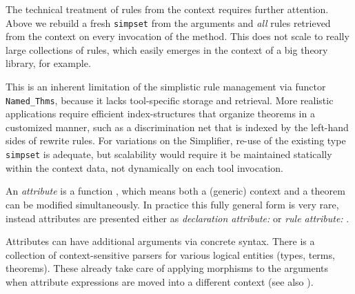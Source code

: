 \begin{isabellebody}
\begin{isamarkuptext}
  \medskip The technical treatment of rules from the context requires
  further attention.  Above we rebuild a fresh \verb|simpset| from
  the arguments and \emph{all} rules retrieved from the context on
  every invocation of the method.  This does not scale to really large
  collections of rules, which easily emerges in the context of a big
  theory library, for example.

  This is an inherent limitation of the simplistic rule management via
  functor \verb|Named_Thms|, because it lacks tool-specific
  storage and retrieval.  More realistic applications require
  efficient index-structures that organize theorems in a customized
  manner, such as a discrimination net that is indexed by the
  left-hand sides of rewrite rules.  For variations on the Simplifier,
  re-use of the existing type \verb|simpset| is adequate, but
  scalability would require it be maintained statically within the
  context data, not dynamically on each tool invocation.%
\end{isamarkuptext}%
\isamarkuptrue%
%
\isamarkuptrue%
%
\begin{isamarkuptext}%
An \emph{attribute} is a function , which means both a (generic) context and a theorem
  can be modified simultaneously.  In practice this fully general form
  is very rare, instead attributes are presented either as
  \emph{declaration attribute:}  or
  \emph{rule attribute:} .

  Attributes can have additional arguments via concrete syntax.  There
  is a collection of context-sensitive parsers for various logical
  entities (types, terms, theorems).  These already take care of
  applying morphisms to the arguments when attribute expressions are
  moved into a different context (see also ).


\end{isamarkuptext}
\end{isabellebody}
